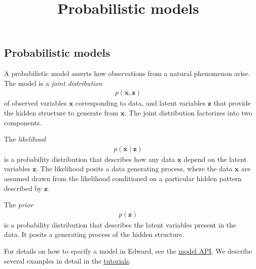 \title{Probabilistic models}

\subsection{Probabilistic models}

A probabilistic model asserts how observations from a natural phenomenon arise.
The model is a \emph{joint distribution}
\begin{align*}
  p(\mathbf{x}, \mathbf{z})
\end{align*}
of observed variables $\mathbf{x}$ corresponding to data, and latent
variables $\mathbf{z}$ that provide the hidden structure to generate
from $\mathbf{x}$. The joint distribution factorizes into two
components.

The \emph{likelihood}
\begin{align*}
  p(\mathbf{x} \mid \mathbf{z})
\end{align*}
is a probability distribution that describes how any data $\mathbf{x}$
depend on the latent variables $\mathbf{z}$. The likelihood posits a
data generating process, where the data $\mathbf{x}$ are assumed drawn
from the likelihood conditioned on a particular hidden pattern
described by $\mathbf{z}$.

The \emph{prior}
\begin{align*}
  p(\mathbf{z})
\end{align*}
is a probability distribution that describes the latent variables
present in the data. It posits a generating process of the hidden structure.

For details on how to specify a model in Edward, see the
\href{/api/model}{model API}. We describe several examples in detail
in the \href{/tutorials/}{tutorials}.
